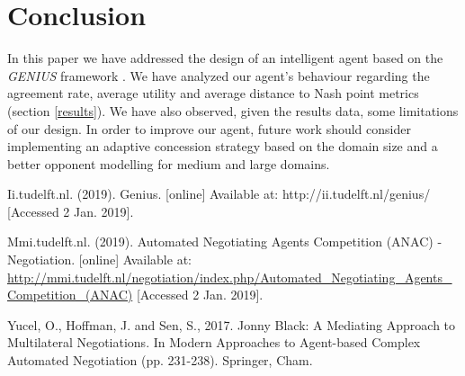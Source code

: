 \documentclass[runningheads]{llncs}
\begin{document}
\section{Conclusion}
In this paper we have addressed the design of an intelligent agent
based on the \textit{GENIUS} framework \cite{genius}. We have analyzed
our agent's behaviour regarding the agreement rate, average utility and
average distance to Nash point metrics (section \ref{results}). We have
also observed, given the results data, some limitations of our
design. In order to improve our agent, future work should consider implementing
an adaptive concession strategy based on the domain size and a better
opponent modelling for medium and large domains.


\begin{thebibliography}{8}

Ii.tudelft.nl. (2019). Genius. [online] Available at:
http://ii.tudelft.nl/genius/ [Accessed 2 Jan. 2019].
  
Mmi.tudelft.nl. (2019). Automated Negotiating Agents Competition
(ANAC) - Negotiation. [online] Available at:
\url{http://mmi.tudelft.nl/negotiation/index.php/Automated\_Negotiating\_Agents\_Competition\_(ANAC)}
    [Accessed 2 Jan. 2019].

Yucel, O., Hoffman, J. and Sen, S., 2017. Jonny Black: A Mediating Approach to Multilateral Negotiations. In Modern Approaches to Agent-based Complex Automated Negotiation (pp. 231-238). Springer, Cham.

\end{thebibliography}
\end{document}
